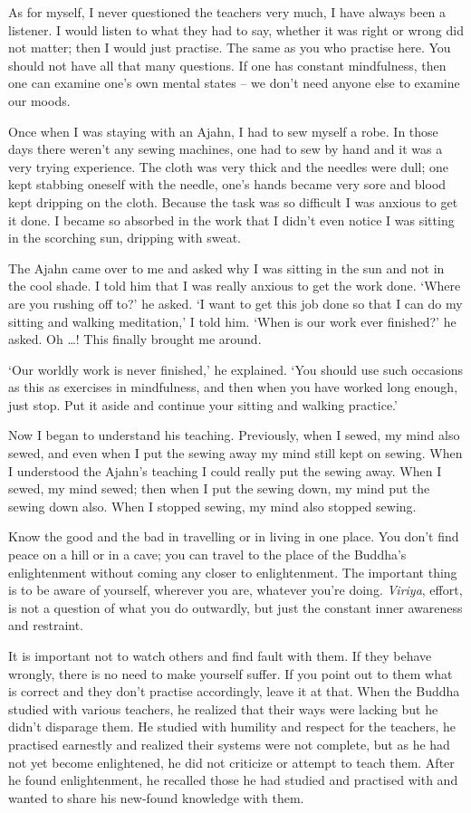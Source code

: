 As for myself, I never questioned the teachers very much, I have always
been a listener. I would listen to what they had to say, whether it was
right or wrong did not matter; then I would just practise. The same as
you who practise here. You should not have all that many questions. If
one has constant mindfulness, then one can examine one's own mental
states -- we don't need anyone else to examine our moods.

Once when I was staying with an Ajahn, I had to sew myself a robe. In
those days there weren't any sewing machines, one had to sew by hand and
it was a very trying experience. The cloth was very thick and the
needles were dull; one kept stabbing oneself with the needle, one's
hands became very sore and blood kept dripping on the cloth. Because the
task was so difficult I was anxious to get it done. I became so absorbed
in the work that I didn't even notice I was sitting in the scorching
sun, dripping with sweat.

The Ajahn came over to me and asked why I was sitting in the sun and not
in the cool shade. I told him that I was really anxious to get the work
done. `Where are you rushing off to?' he asked. `I want to get this job
done so that I can do my sitting and walking meditation,' I told him.
`When is our work ever finished?' he asked. Oh \ldots{}! This finally
brought me around.

`Our worldly work is never finished,' he explained. `You should use such
occasions as this as exercises in mindfulness, and then when you have
worked long enough, just stop. Put it aside and continue your sitting
and walking practice.'

Now I began to understand his teaching. Previously, when I sewed, my
mind also sewed, and even when I put the sewing away my mind still kept
on sewing. When I understood the Ajahn's teaching I could really put the
sewing away. When I sewed, my mind sewed; then when I put the sewing
down, my mind put the sewing down also. When I stopped sewing, my mind
also stopped sewing.

Know the good and the bad in travelling or in living in one place. You
don't find peace on a hill or in a cave; you can travel to the place of
the Buddha's enlightenment without coming any closer to enlightenment. 
The important thing is to be aware of yourself, wherever you are, 
whatever you're doing. \emph{Viriya}, effort, is not a question of what
you do outwardly, but just the constant inner awareness and restraint. 

It is important not to watch others and find fault with them. If they
behave wrongly, there is no need to make yourself suffer. If you point
out to them what is correct and they don't practise accordingly, leave
it at that. When the Buddha studied with various teachers, he realized
that their ways were lacking but he didn't disparage them. He studied
with humility and respect for the teachers, he practised earnestly and
realized their systems were not complete, but as he had not yet become
enlightened, he did not criticize or attempt to teach them. After he
found enlightenment, he recalled those he had studied and practised with
and wanted to share his new-found knowledge with them. 

